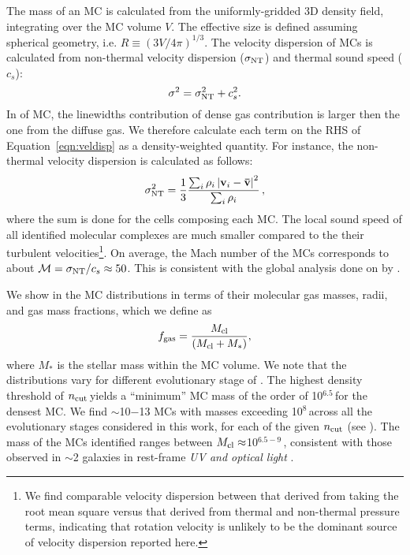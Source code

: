 \IfFileExists{emulateapjlegacy.cls}{\documentclass[iop]{emulateapjlegacy}}{\documentclass[iop]{emulateapj}}
\begin{document}
The mass of an MC is calculated from the uniformly-gridded 3D density field, integrating over the MC volume $V$. The effective size is defined assuming spherical geometry, i.e. $R \equiv (3 V /4 \pi)^{1/3}$.
%
The velocity dispersion of MCs is calculated from non-thermal velocity dispersion ($\sigma_{\rm NT}$) and thermal sound speed ($c_s$):
\begin{equation}
\sigma^2 = \sigma_{\rm NT}^2 + c_s^2.
\label{eqn:veldisp}
\end{equation}
%
In \obs of MC, the linewidths contribution of dense gas contribution is larger then the one from the diffuse gas. We therefore calculate
each term on the RHS of Equation~\ref{eqn:veldisp} as a density-weighted quantity. For instance, the non-thermal velocity dispersion is
calculated as follows:
\begin{equation}
\sigma_{\rm NT}^2 = \frac{1}{{3}}\frac{\sum_{i} \rho_i \left|\mathbf{v}_i - \mathbf{\bar v}\right|^2}{\sum_i \rho_i}\,,
\end{equation}
where the sum is done for the cells composing each MC.
The local sound speed of all identified molecular complexes are much smaller compared to the their turbulent velocities\footnote{We find comparable velocity dispersion between that derived from taking the root mean square versus that derived from thermal and non-thermal pressure terms, indicating that rotation velocity is unlikely to be the dominant source of velocity dispersion reported here.\label{ftn:veldisp}}.
On average, the Mach number of the MCs corresponds to about $\mathcal{M} = \sigma_{\rm NT}/c_s\approx 50$. This is consistent with the global analysis done on \flower by \citet{Vallini18a}.

We show in  the MC distributions in terms of their molecular gas masses, radii, and gas mass fractions, which we define as
\begin{equation}
f_{\rm gas} = \frac{M_{\rm cl}} {\left(M_{\rm cl} + M_*\right)},
\end{equation}
where $M_*$ is the stellar mass within the MC volume.
%
We note that the distributions vary for different evolutionary stage of \flower. The highest density threshold of $n_{\rm cut}$\,\cc yields a ``minimum'' MC mass of the order of 10$^{6.5}$\,\Msun for the densest MC.
%
We find $\sim$10$-$13 MCs with masses exceeding 10$^8$\,\Msun across all the evolutionary stages considered in this work,
for each of the given $n_{\rm cut}$ (see ). The mass of the MCs identified ranges between $M_{\rm cl}\approx$10$^{6.5-9}$\,\Msun, consistent with those observed in \z$\sim$2 galaxies in rest-frame {\it UV and optical light} \citep{Elmegreen07a, Elmegreen09a}.
\end{document}
